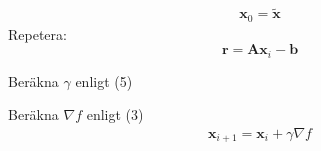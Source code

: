 \documentclass{article}
\begin{document}
\begin{gather*}
    \mathbf{x}_0 = \mathbf{\tilde{x} }
\end{gather*}
Repetera:
\begin{equation*}
    \mathbf{r} = \mathbf{A}\mathbf{x}_i - \mathbf{b}
\end{equation*}

    Beräkna $\gamma $ enligt (5)

    Beräkna $\nabla f$ enligt (3)
\begin{gather*}
        \mathbf{x}_{i+1} = \mathbf{x}_i + \gamma \nabla f 
\end{gather*}
\end{document}
